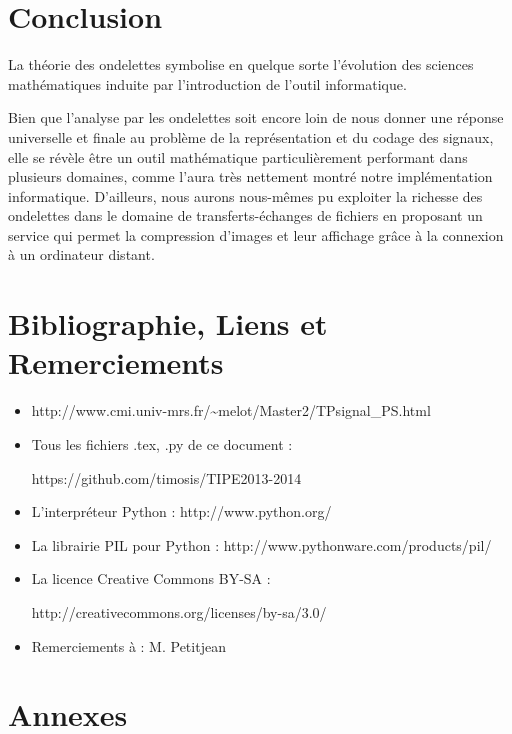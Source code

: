 \documentclass{article}
\begin{document}
\section{Conclusion}


La théorie des ondelettes symbolise en quelque sorte l'évolution des sciences mathématiques induite par l'introduction de l'outil informatique.
 
Bien que l'analyse par les ondelettes soit encore loin de nous donner une réponse universelle et finale au problème de la représentation et du codage des signaux, elle se révèle être un outil mathématique particulièrement performant dans plusieurs domaines, comme l'aura très nettement montré notre implémentation informatique.
D'ailleurs, nous aurons nous-mêmes pu exploiter la richesse des ondelettes dans le domaine de transferts-échanges de fichiers en proposant un service qui permet la compression d'images et leur affichage grâce à la connexion à un ordinateur distant.



\section{Bibliographie, Liens et Remerciements}
\label{links}
\begin{itemize}
\item http://www.cmi.univ-mrs.fr/\textasciitilde{}melot/Master2/TPsignal\_PS.html

\item Tous les fichiers .tex, .py de ce document :

https://github.com/timosis/TIPE2013-2014

\item L'interpréteur Python : http://www.python.org/

\item La librairie PIL pour Python : http://www.pythonware.com/products/pil/

\item La licence Creative Commons BY-SA :

http://creativecommons.org/licenses/by-sa/3.0/

\item Remerciements à : M. Petitjean
\end{itemize}


\clearpage
\lstset{language=Python,frame=single,breaklines=true,extendedchars=true, numbers=left,basicstyle=\footnotesize}
\section{Annexes}
\end{document}
